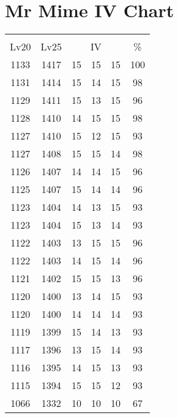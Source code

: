 \documentclass{article}%
\begin{document}
%
\normalsize%
\section{Mr Mime IV Chart}%
\label{sec:Mr Mime IV Chart}%
\renewcommand{\arraystretch}{1.5}%
\begin{tabular}{|c|c|c|c|c|c|}%
\hline%
\multicolumn{6}{|c|}{\textcolor{white}{ 
\linebreak{Mr Mime}
}%
\cellcolor{black}}\\%
\multicolumn{1}{|c}{Lv20}&\multicolumn{1}{c|}{Lv25}&\multicolumn{3}{c|}{IV}&\multicolumn{1}{|c|}{\%}\\%
\hline%
\rowcolor{color100}%
1133&1417&15&15&15&100\\%
\hline%
\rowcolor{color98}%
1131&1414&15&14&15&98\\%
\hline%
\rowcolor{color96}%
1129&1411&15&13&15&96\\%
\hline%
\rowcolor{color98}%
1128&1410&14&15&15&98\\%
\hline%
\rowcolor{color93}%
1127&1410&15&12&15&93\\%
\hline%
\rowcolor{color98}%
1127&1408&15&15&14&98\\%
\hline%
\rowcolor{color96}%
1126&1407&14&14&15&96\\%
\hline%
\rowcolor{color96}%
1125&1407&15&14&14&96\\%
\hline%
\rowcolor{color93}%
1123&1404&14&13&15&93\\%
\hline%
\rowcolor{color93}%
1123&1404&15&13&14&93\\%
\hline%
\rowcolor{color96}%
1122&1403&13&15&15&96\\%
\hline%
\rowcolor{color96}%
1122&1403&14&15&14&96\\%
\hline%
\rowcolor{color96}%
1121&1402&15&15&13&96\\%
\hline%
\rowcolor{color93}%
1120&1400&13&14&15&93\\%
\hline%
\rowcolor{color93}%
1120&1400&14&14&14&93\\%
\hline%
\rowcolor{color93}%
1119&1399&15&14&13&93\\%
\hline%
\rowcolor{color93}%
1117&1396&13&15&14&93\\%
\hline%
\rowcolor{color93}%
1116&1395&14&15&13&93\\%
\hline%
\rowcolor{color93}%
1115&1394&15&15&12&93\\%
\hline%
\rowcolor{color91}%
1066&1332&10&10&10&67\\%
\end{tabular}

%
\end{document}
